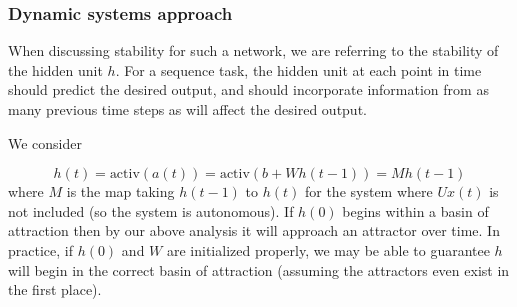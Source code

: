 \documentclass{beamer}
\begin{document}
\begin{frame}
  \frametitle{Dynamic systems approach}
  When discussing stability for such a network, we are referring to the stability of the hidden unit $h$. For a sequence task, the hidden unit at each point in time should predict the desired output, and should incorporate information from as many previous time steps as will affect the desired output.

    \vspace{0.5cm}
  
  We consider

\begin{equation*}
h(t) = \mbox{activ}(a(t)) = \mbox{activ}(b + W h(t-1)) = M h(t-1)
\end{equation*}
%
where $M$ is the map taking $h(t - 1)$ to $h(t)$ for the system where $Ux(t)$ is not included (so the system is autonomous). If $h(0)$ begins within a basin of attraction then by our above analysis it will approach an attractor over time. In practice, if $h(0)$ and $W$ are initialized properly, we may be able to guarantee $h$ will begin in the correct basin of attraction (assuming the attractors even exist in the first place).

\end{frame}
\end{document}
